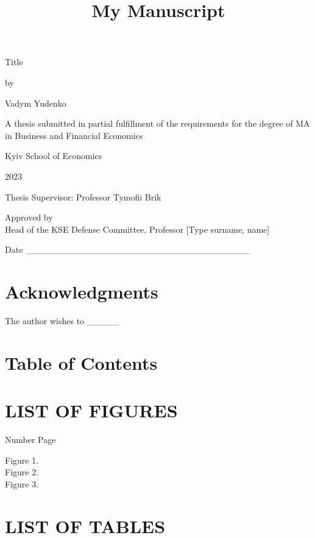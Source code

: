 \documentclass[
  letterpaper,
  DIV=11,
  numbers=noendperiod]{scrartcl}
\title{My Manuscript}
\author{}
\date{}
\begin{document}
\maketitle
\ifdefined\Shaded\renewenvironment{Shaded}{\begin{tcolorbox}[boxrule=0pt, interior hidden, enhanced, borderline west={3pt}{0pt}{shadecolor}, frame hidden, breakable, sharp corners]}{\end{tcolorbox}}\fi

Title

by

Vadym Yudenko

A thesis submitted in partial fulfillment of the requirements for the
degree of MA in Business and Financial Economics

Kyiv School of Economics

2023

Thesis Supervisor: Professor Tymofii Brik

Approved by\\
Head of the KSE Defense Committee, Professor {[}Type surname, name{]}

Date
\_\_\_\_\_\_\_\_\_\_\_\_\_\_\_\_\_\_\_\_\_\_\_\_\_\_\_\_\_\_\_\_\_\_\_

\hypertarget{acknowledgments}{%
\section{Acknowledgments}\label{acknowledgments}}

The author wishes to \_\_\_\_\_

\hypertarget{table-of-contents}{%
\section{Table of Contents}\label{table-of-contents}}

\hypertarget{list-of-figures}{%
\section{LIST OF FIGURES}\label{list-of-figures}}

Number Page

Figure 1.\\
Figure 2.\\
Figure 3.

\hypertarget{list-of-tables}{%
\section{LIST OF TABLES}\label{list-of-tables}}
\end{document}
